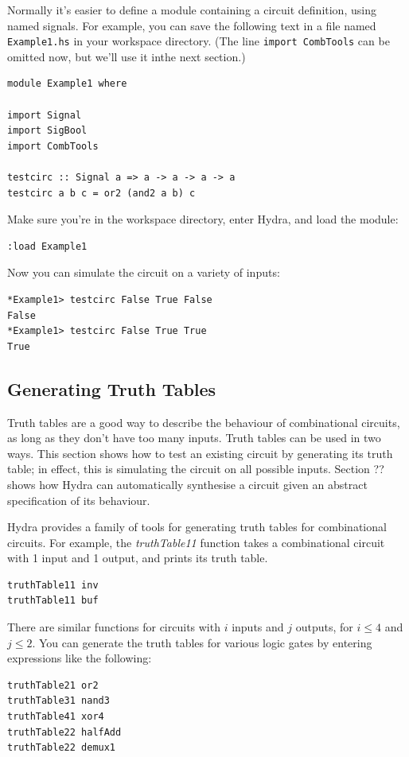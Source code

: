 \documentclass[a4paper,openany,fleqn]{book}
\newcounter{exercisenum}
\newenvironment*{exercise}
  {\addtocounter{exercisenum}{1}
   \vspace{10pt}\noindent\textbf{Exercise \arabic{exercisenum}. }}
  {}
\begin{document}
Normally it's easier to define a module containing a circuit
definition, using named signals.  For example, you can save the
following text in a file named \texttt{Example1.hs} in your workspace
directory.  (The line \texttt{import CombTools} can be omitted now,
but we'll use it inthe next section.)
\begin{verbatim}
module Example1 where

import Signal
import SigBool
import CombTools

testcirc :: Signal a => a -> a -> a -> a
testcirc a b c = or2 (and2 a b) c
\end{verbatim}
Make sure you're in the workspace directory, enter Hydra, and load the
module:
\begin{verbatim}
:load Example1
\end{verbatim}
Now you can simulate the circuit on a variety of inputs:
\begin{verbatim}
*Example1> testcirc False True False
False
*Example1> testcirc False True True 
True
\end{verbatim}



\subsection{Generating Truth Tables}
\label{sec:generate-truth-table}

Truth tables are a good way to describe the behaviour of combinational
circuits, as long as they don't have too many inputs.  Truth tables
can be used in two ways.  This section shows how to test an existing
circuit by generating its truth table; in effect, this is simulating
the circuit on all possible inputs.  Section ?? shows how Hydra can
automatically synthesise a circuit given an abstract specification of
its behaviour.

Hydra provides a family of tools for generating truth tables for
combinational circuits.  For example, the \textit{truthTable11}
function takes a combinational circuit with 1 input and 1 output, and
prints its truth table.
\begin{verbatim}
truthTable11 inv
truthTable11 buf
\end{verbatim}
There are similar functions for circuits with $i$ inputs and $j$
outputs, for $i \leq 4$ and $j\leq2$.  You can generate the truth
tables for various logic gates by entering expressions like the
following:
\begin{verbatim}
truthTable21 or2
truthTable31 nand3
truthTable41 xor4
truthTable22 halfAdd
truthTable22 demux1
\end{verbatim}
\end{document}
